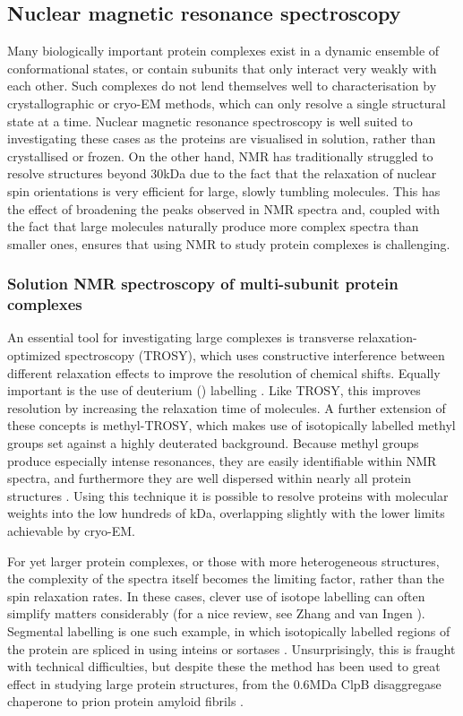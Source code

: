 \documentclass[a4paper,11pt,twoside,openright]{scrbook}
\begin{document}
\subsection{Nuclear magnetic resonance spectroscopy}
Many biologically important protein complexes exist in a dynamic ensemble of conformational states, or contain subunits that only interact very weakly with each other. Such complexes do not lend themselves well to characterisation by crystallographic or cryo-EM methods, which can only resolve a single structural state at a time. Nuclear magnetic resonance spectroscopy is well suited to investigating these cases as the proteins are visualised in solution, rather than crystallised or frozen. On the other hand, NMR has traditionally struggled to resolve structures beyond 30kDa due to the fact that the relaxation of nuclear spin orientations is very efficient for large, slowly tumbling molecules. This has the effect of broadening the peaks observed in NMR spectra and, coupled with the fact that large molecules naturally produce more complex spectra than smaller ones, ensures that using NMR to study protein complexes is challenging.

\subsubsection{Solution NMR spectroscopy of multi-subunit protein complexes}
An essential tool for investigating large complexes is transverse relaxation-optimized spectroscopy \cite{Pervushin1997} (TROSY), which uses constructive interference between different relaxation effects to improve the resolution of chemical shifts. Equally important is the use of deuterium () labelling \cite{Sattler1996}. Like TROSY, this improves resolution by increasing the relaxation time of molecules. A further extension of these concepts is methyl-TROSY, which makes use of isotopically labelled  methyl groups set against a highly deuterated background. Because methyl groups produce especially intense resonances, they are easily identifiable within NMR spectra, and furthermore they are well dispersed within nearly all protein structures \cite{Ollerenshaw2003}. Using this technique it is possible to resolve proteins with molecular weights into the low hundreds of kDa, overlapping slightly with the lower limits achievable by cryo-EM.

For yet larger protein complexes, or those with more heterogeneous structures, the complexity of the spectra itself becomes the limiting factor, rather than the spin relaxation rates. In these cases, clever use of isotope labelling can often simplify matters considerably (for a nice review, see Zhang and van Ingen \cite{Zhang2016}). Segmental labelling is one such example, in which isotopically labelled regions of the protein are spliced in using inteins or sortases \cite{Liu2009a}. Unsurprisingly, this is fraught with technical difficulties, but despite these the method has been used to great effect in studying large protein structures, from the 0.6MDa ClpB disaggregase chaperone \cite{Rosenzweig2015} to prion protein amyloid fibrils \cite{Frederick2017}.
\end{document}
